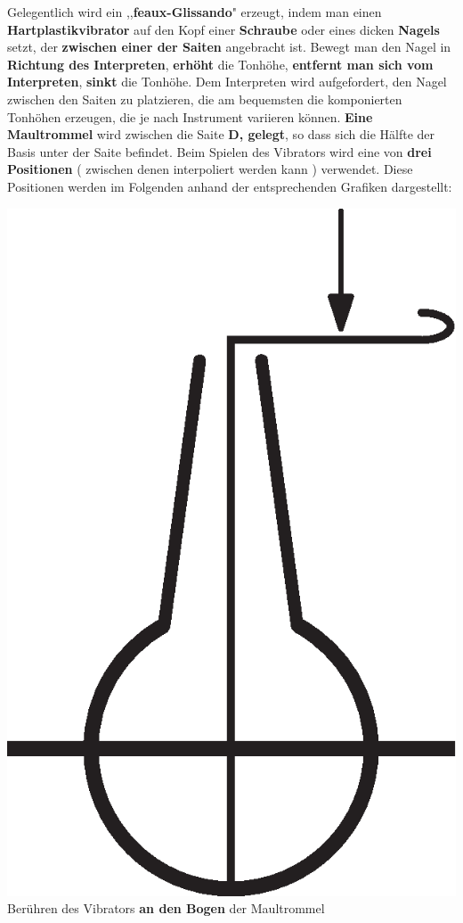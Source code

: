 \documentclass[12pt]{article}
\newcommand*\circled[1]{\tikz[baseline=(char.base)]{
            \node[shape=circle,draw,inner sep=1pt] (char) {#1};}}
\begin{document}
\textbf{\circled{2}} Gelegentlich wird ein ,,\textbf{feaux-Glissando}" erzeugt, indem man einen \textbf{Hartplastikvibrator} auf den Kopf einer \textbf{Schraube} oder eines dicken \textbf{Nagels} setzt, der \textbf{zwischen einer der Saiten} angebracht ist. Bewegt man den Nagel in \textbf{Richtung des Interpreten}, \textbf{erhöht} die Tonhöhe, \textbf{entfernt man sich vom Interpreten}, \textbf{sinkt} die Tonhöhe. Dem Interpreten wird aufgefordert, den Nagel zwischen den Saiten zu platzieren, die am bequemsten die komponierten Tonhöhen erzeugen, die je nach Instrument variieren können. \textbf{\circled{3} Eine Maultrommel} wird zwischen die Saite \textbf{D, gelegt}, so dass sich die Hälfte der Basis unter der Saite befindet. Beim Spielen des Vibrators wird eine von \textbf{drei Positionen} ( zwischen denen interpoliert werden kann ) verwendet. Diese Positionen werden im Folgenden anhand der entsprechenden Grafiken dargestellt:

\includegraphics[scale=0.17]{crook.eps}
\circled{1} Berühren des Vibrators \textbf{an den Bogen} der Maultrommel \\
\end{document}
